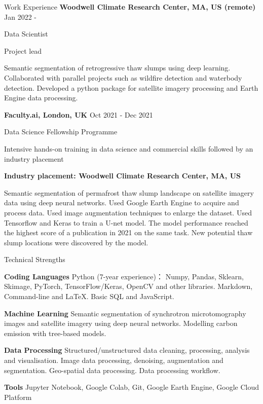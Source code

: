 \documentclass{resume} %
\newenvironment{indentpar}[1]%
  {\begin{list}{}%
          {\setlength{\leftmargin}{#1}}%
          \item[]%
  }
  {\end{list}}
\begin{document}
\begin{rSection}{Work Experience}
{\bf Woodwell Climate Research Center, MA, US (remote)} \hfill {Jan 2022 - } 

\begin{indentpar} {0.5cm} Data Scientist
\begin{indentpar} {0.5cm} Project lead
\end{indentpar}
\begin{indentpar} {0.5cm} Semantic segmentation of retrogressive thaw slumps using deep learning. Collaborated with parallel projects such as wildfire detection and waterbody detection. Developed a python package for satellite imagery processing and Earth Engine data processing.
\end{indentpar}

\end{indentpar}
{\bf Faculty.ai, London, UK} \hfill {Oct 2021 - Dec 2021} 
\begin{indentpar}{0.5cm}

Data Science Fellowship Programme
\begin{indentpar}{0.5cm}
Intensive hands-on training in data science and commercial skills followed by an industry placement


{\bf Industry placement: Woodwell Climate Research Center, MA, US}

Semantic segmentation of permafrost thaw slump landscape on satellite imagery data using deep neural networks. Used Google Earth Engine to acquire and process data. Used image augmentation techniques to enlarge the dataset. Used Tensorflow and Keras to train a U-net model. The model performance reached the highest score of a publication in 2021 on the same task. New potential thaw slump locations were discovered by the model.
\end{indentpar}
\end{indentpar}
\end{rSection}
\begin{rSection}{Technical Strengths}

\begin{indentpar}{0.5cm}
\textbf{Coding Languages} Python (7-year experience)： Numpy, Pandas, Sklearn, Skimage, PyTorch, TensorFlow/Keras, OpenCV and other libraries. Markdown, Command-line and LaTeX. Basic SQL and JavaScript.

\textbf{Machine Learning} Semantic segmentation of synchrotron microtomography images and satellite imagery using deep neural networks. Modelling carbon emission with tree-based models.

\textbf{Data Processing} Structured/unstructured data cleaning, processing, analysis and visualisation. Image data processing, denoising, augmentation and segmentation. Geo-spatial data processing. Data processing workflow.

\textbf{Tools} Jupyter Notebook, Google Colab, Git, Google Earth Engine, Google Cloud Platform

\end{indentpar}
\end{rSection}
\end{document}
